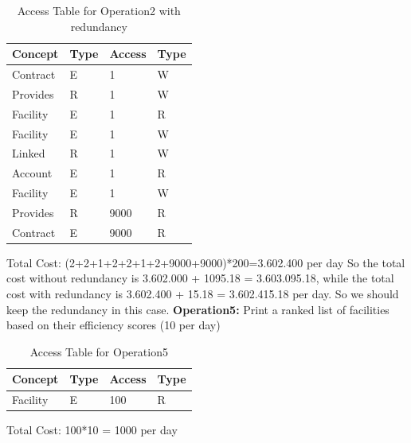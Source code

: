 \begin{table}[H]
    \renewcommand{\arraystretch}{1.3} %
    \begin{tabularx}{\textwidth}{|X|X|X|X|}
    \hline
    \textbf{Concept}& \textbf{Type}  & \textbf{Access}    & \textbf{Type}     \\ \hline
    Contract & E & 1 & W \\ \hline
    Provides & R & 1 & W \\ \hline
    Facility & E & 1 & R \\ \hline
    Facility & E & 1 & W \\ \hline
    Linked & R & 1 & W \\ \hline
    Account & E & 1 & R \\ \hline
    Facility & E & 1 & W \\ \hline
    Provides & R & 9000 & R \\ \hline
    Contract & E & 9000 & R \\ \hline
    \end{tabularx}
    \caption{Access Table for Operation2 with redundancy}
\end{table}
\noindent Total Cost: (2+2+1+2+2+1+2+9000+9000)*200=3.602.400 per day
\newline
\noindent So the total cost without redundancy is 3.602.000 + 1095.18 = 3.603.095.18, while the total cost with redundancy is 3.602.400 + 15.18 = 3.602.415.18 per day. So we should keep the redundancy in this case. 
\newline
\noindent \textbf{Operation5:} Print a ranked list of facilities based on their efficiency scores (10 per day)
\begin{table}[H]
    \renewcommand{\arraystretch}{1.3} %
    \begin{tabularx}{\textwidth}{|X|X|X|X|}
    \hline
    \textbf{Concept}& \textbf{Type}  & \textbf{Access}    & \textbf{Type}     \\ \hline
    Facility & E & 100 & R \\ \hline
    \end{tabularx}
    \caption{Access Table for Operation5}
\end{table}
\noindent Total Cost: 100*10 = 1000 per day

